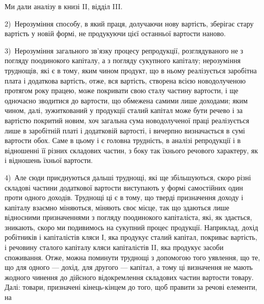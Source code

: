 Ми дали аналізу в книзі II, відділ III.

2)~Нерозуміння способу, в який праця, долучаючи нову вартість, зберігає
стару вартість у новій формі, не продукуючи цієї останньої вартости наново.

3)~Нерозуміння загального зв’язку процесу репродукції, розглядуваного не
з погляду поодинокого капіталу, а з погляду сукупного капіталу; нерозуміння
труднощів, які є в тому, яким чином продукт, що в ньому реалізується заробітна
плата і додаткова вартість, отже, вся вартість, створена всією новодолученою
протягом року працею, може покривати свою сталу частину вартости, і ще одночасно
зводитися до вартости, що обмежена самими лише доходами; яким чином,
далі, зужиткований у продукції сталий капітал може бути речево і за
вартістю покритий новим, хоч загальна сума новодолученої праці реалізується
лише в заробітній платі і додатковій вартості, і вичерпно визначається в сумі
вартости обох. Саме в цьому і є головна трудність, в аналізі репродукції і в відношенні
її різних складових частин, з боку так їхнього речового характеру, як
і відношень їхньої вартости.

4)~Але сюди приєднуються дальші труднощі, які ще збільшуються, скоро
різні складові частини додаткової вартости виступають у формі самостійних один
проти одного доходів. Труднощі ці є в тому, що тверді призначення доходу і
капіталу взаємно міняються, міняють своє місце, так що здаються лише відносними
призначеннями з погляду поодинокого капіталіста, які, як здається, зникають,
скоро ми подивимось на сукупний процес продукції. Наприклад, дохід
робітників і капіталістів кляси І, яка продукує сталий капітал, покриває вартість,
і речовину сталого капіталу кляси капіталістів II, яка продукує засоби споживання.
Отже, можна поминути труднощі з допомогою того уявлення, що те, що
для одного — дохід, для другого — капітал, а тому ці визначення не мають жодного
чинення до дійсного відокремлення складових частин вартости товару. Далі:
товари, призначені кінець-кінцем до того, щоб правити за речові елементи, на
\parbreak{}  %
